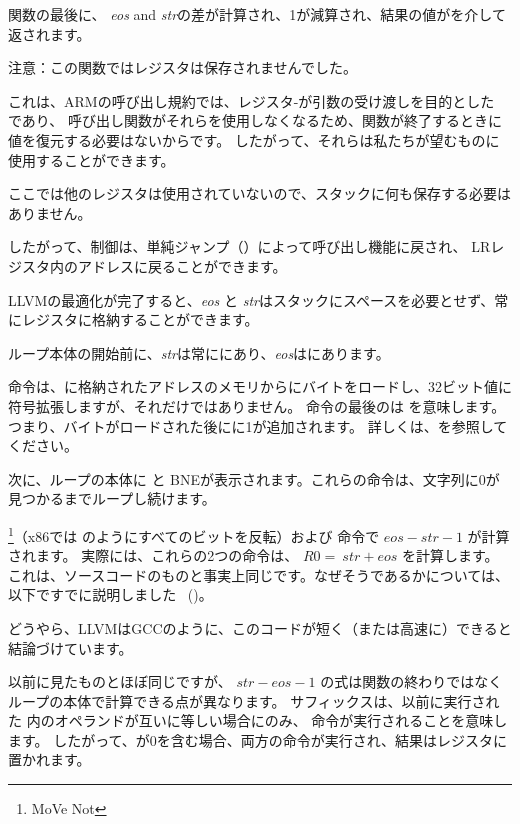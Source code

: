 関数の最後に、
\emph{eos} and \emph{str}の差が計算され、1が減算され、結果の値がを介して返されます。

注意：この関数ではレジスタは保存されませんでした。

これは、ARMの呼び出し規約では、レジスタ-が引数の受け渡しを目的とした であり、
呼び出し関数がそれらを使用しなくなるため、関数が終了するときに値を復元する必要はないからです。
したがって、それらは私たちが望むものに使用することができます。

ここでは他のレジスタは使用されていないので、スタックに何も保存する必要はありません。

したがって、制御は、単純ジャンプ（）によって呼び出し機能に戻され、
\ac{LR}レジスタ内のアドレスに戻ることができます。

\mysubparagraph{\OptimizingXcodeIV (\ThumbMode)}



LLVMの最適化が完了すると、\emph{eos} と \emph{str}はスタックにスペースを必要とせず、常にレジスタに格納することができます。

ループ本体の開始前に、\emph{str}は常ににあり、\emph{eos}はにあります。

命令は、に格納されたアドレスのメモリからにバイトをロードし、32ビット値に符号拡張しますが、それだけではありません。
命令の最後のは を意味します。つまり、バイトがロードされた後にに1が追加されます。
詳しくは、を参照してください。

次に、ループの本体に \CMP と \ac{BNE}が表示されます。これらの命令は、文字列に0が見つかるまでループし続けます。

\footnote{MoVe Not}（x86では \NOT のようにすべてのビットを反転）および \ADD 命令で $eos - str - 1$ が計算されます。
実際には、これらの2つの命令は、 $R0 = ~str + eos$ を計算します。
これは、ソースコードのものと事実上同じです。なぜそうであるかについては、以下ですでに説明しました
~()。

どうやら、LLVMはGCCのように、このコードが短く（または高速に）できると結論づけています。

\mysubparagraph{\OptimizingKeilVI (\ARMMode)}




以前に見たものとほぼ同じですが、 $str - eos - 1$ の式は関数の終わりではなく
ループの本体で計算できる点が異なります。 
サフィックスは、以前に実行された \CMP 内のオペランドが互いに等しい場合にのみ、
命令が実行されることを意味します。 
したがって、が0を含む場合、両方の命令が実行され、結果はレジスタに置かれます。
